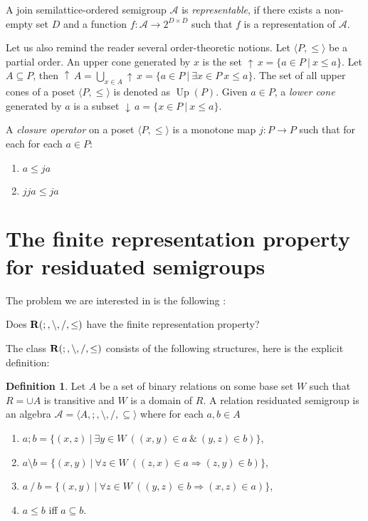 \documentclass[a4paper]{article}
\theoremstyle{definition}
\newtheorem{definition}{Definition}
\theoremstyle{theorem}
\theoremstyle{proposition}
\theoremstyle{lemma}
\theoremstyle{ex}
\theoremstyle{corollary}
\theoremstyle{claim}
\newcommand{\down}[1]{\ensuremath{{\downarrow}\,#1}}
\newcommand{\up}[1]{\ensuremath{{\uparrow}\,#1}}
\begin{document}
A join semilattice-ordered semigroup $\mathcal{A}$ is \emph{representable}, if there exists a non-empty set $D$ and a function $f : \mathcal{A} \to 2^{D \times D}$ such that $f$ is a representation of $\mathcal{A}$.

Let us also remind the reader several order-theoretic notions. Let $\langle P, \leq \rangle$ be a partial order. An upper cone generated by $x$ is the set $\up{x} = \{ a \in P \: | \: x \leq a \}$. Let $A \subseteq P$, then $\up{A} = \bigcup \limits_{x \in A} \up{x} = \{ a \in P \: | \: \exists x \in P \: x \leq a \}$. The set of all upper cones of a poset $\langle P, \leq \rangle$ is denoted as $\operatorname{Up}(P)$. Given $a \in P$, a \emph{lower cone} generated by $a$ is a subset $\down{a} = \{ x \in P \: | \: x \leq a \}$.

A \emph{closure operator} on a poset $\langle P, \leq \rangle$ is a monotone map $j : P \to P$
such that for each for each $a \in P$:
\begin{enumerate}
  \item $a \leq j a$
  \item $j j a \leq j a$
\end{enumerate}

\section{The finite representation property for residuated semigroups}

The problem we are interested in is the following \cite[Problem 19.17]{hirsch2002relation}:

\begin{center}
  Does ${\bf R}(;, \setminus, /, \leq)$ have the finite representation property?
\end{center}

The class ${\bf R}(;, \setminus, /, \leq)$ consists of the following structures, here is the explicit definition:

\begin{definition} \label{rrs}
  Let $A$ be a set of binary relations on some base set $W$ such that $R = \cup A$ is transitive and $W$ is a domain of $R$. A relation residuated semigroup is an algebra $\mathcal{A} = \langle A, ;, \setminus, /, \subseteq \rangle$ where for each $a, b \in A$
  \begin{enumerate}
    \item $a ; b = \{ (x, z) \: | \: \exists y \in W \: ((x, y) \in a \: \& \: (y, z) \in b) \}$,
    \item $a \setminus b = \{ (x, y) \: | \: \forall z \in W \: ((z, x) \in a \Rightarrow (z, y) \in b)\}$,
    \item $a \: / \: b = \{ (x, y) \: | \: \forall z \in W \: ((y, z) \in b \Rightarrow (x, z) \in a)\}$,
    \item $a \leq b$ iff $a \subseteq b$.
  \end{enumerate}
\end{definition}
\end{document}
